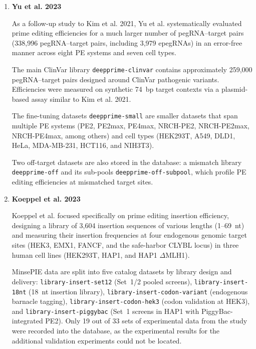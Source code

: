\documentclass{article}
\begin{document}
\begin{enumerate}
    A separate endogenous validation dataset \nolinkurl{deeppe-endo} contains arrayed pegRNA experiments at native genomic loci in HEK293T, HCT116, and MDA-MB-231 cells, where both pegRNAs and PE2 were delivered by plasmid transfection. Editing efficiencies are averaged across biological and technical replicates (BR1--BR2 $\times$ TR1--TR2).

    \item \textbf{Yu et al. 2023}

    As a follow-up study to Kim et al. 2021, Yu et al.\cite{yuPredictionEfficienciesDiverse2023} systematically evaluated prime editing efficiencies for a much larger number of pegRNA--target pairs (338,996 pegRNA--target pairs, including 3,979 epegRNAs) in an error-free manner across eight PE systems and seven cell types.

    The main ClinVar library \nolinkurl{deepprime-clinvar} contains approximately 259,000 pegRNA--target pairs designed around ClinVar pathogenic variants. Efficiencies were measured on synthetic 74~bp target contexts via a plasmid-based assay similar to Kim et al. 2021. 

    The fine-tuning datasets \nolinkurl{deepprime-small} are smaller datasets that span multiple PE systems (PE2, PE2max, PE4max, NRCH-PE2, NRCH-PE2max, NRCH-PE4max, among others) and cell types (HEK293T, A549, DLD1, HeLa, MDA-MB-231, HCT116, and NIH3T3).

    Two off-target datasets are also stored in the database: a mismatch library \nolinkurl{deepprime-off} and its sub-pools \nolinkurl{deepprime-off-subpool}, which profile PE editing efficiencies at mismatched target sites.

    \item \textbf{Koeppel et al. 2023}

    Koeppel et al.\cite{koeppelPredictionPrimeEditing2023} focused specifically on prime editing insertion efficiency, designing a library of 3,604 insertion sequences of various lengths (1--69~nt) and measuring their insertion frequencies at four endogenous genomic target sites (HEK3, EMX1, FANCF, and the safe-harbor CLYBL locus) in three human cell lines (HEK293T, HAP1, and HAP1 $\Delta$MLH1). 

    MinsePIE data are split into five catalog datasets by library design and delivery:
    \nolinkurl{library-insert-set12} (Set~1/2 pooled screens),
    \nolinkurl{library-insert-18nt} (18~nt insertion library),
    \nolinkurl{library-insert-codon-variant} (endogenous barnacle tagging),
    \nolinkurl{library-insert-codon-hek3} (codon validation at HEK3), and
    \nolinkurl{library-insert-piggybac} (Set~1 screens in HAP1 with PiggyBac-integrated PE2).
    Only 19 out of 33 sets of experimental data from the study were recorded into the database, as the experimental results for the additional validation experiments could not be located.


\end{enumerate}
\end{document}
